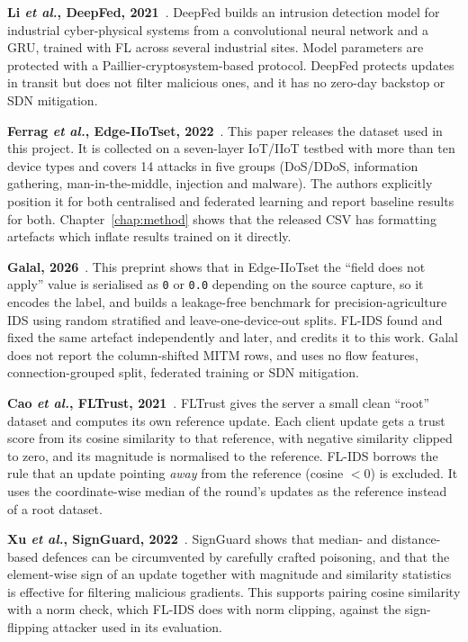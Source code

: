 \textbf{Li \emph{et al.}, DeepFed, 2021}~\cite{li2021deepfed}. DeepFed builds an intrusion detection model for industrial cyber-physical systems from a convolutional neural network and a GRU, trained with FL across several industrial sites. Model parameters are protected with a Paillier-cryptosystem-based protocol. DeepFed protects updates in transit but does not filter malicious ones, and it has no zero-day backstop or SDN mitigation.

\textbf{Ferrag \emph{et al.}, Edge-IIoTset, 2022}~\cite{ferrag2022edge}. This paper releases the dataset used in this project. It is collected on a seven-layer IoT/IIoT testbed with more than ten device types and covers 14 attacks in five groups (DoS/DDoS, information gathering, man-in-the-middle, injection and malware). The authors explicitly position it for both centralised and federated learning and report baseline results for both. Chapter~\ref{chap:method} shows that the released CSV has formatting artefacts which inflate results trained on it directly.

\textbf{Galal, 2026}~\cite{galal2026provenance}. This preprint shows that in Edge-IIoTset the ``field does not apply'' value is serialised as \texttt{0} or \texttt{0.0} depending on the source capture, so it encodes the label, and builds a leakage-free benchmark for precision-agriculture IDS using random stratified and leave-one-device-out splits. FL-IDS found and fixed the same artefact independently and later, and credits it to this work. Galal does not report the column-shifted MITM rows, and uses no flow features, connection-grouped split, federated training or SDN mitigation.

\textbf{Cao \emph{et al.}, FLTrust, 2021}~\cite{cao2021fltrust}. FLTrust gives the server a small clean ``root'' dataset and computes its own reference update. Each client update gets a trust score from its cosine similarity to that reference, with negative similarity clipped to zero, and its magnitude is normalised to the reference. FL-IDS borrows the rule that an update pointing \emph{away} from the reference (cosine $<0$) is excluded. It uses the coordinate-wise median of the round's updates as the reference instead of a root dataset.

\textbf{Xu \emph{et al.}, SignGuard, 2022}~\cite{xu2022signguard}. SignGuard shows that median- and distance-based defences can be circumvented by carefully crafted poisoning, and that the element-wise sign of an update together with magnitude and similarity statistics is effective for filtering malicious gradients. This supports pairing cosine similarity with a norm check, which FL-IDS does with norm clipping, against the sign-flipping attacker used in its evaluation.

